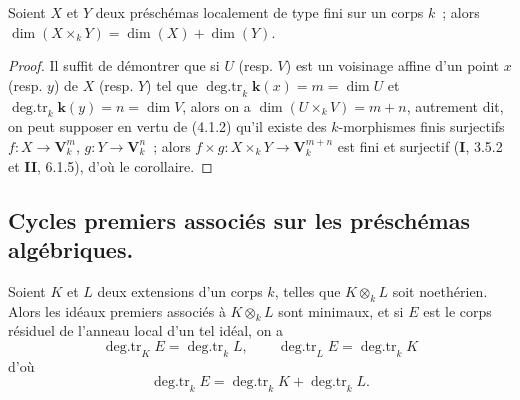 \begin{corollary}[4.1.5]
\label{IV.2.4.1.5-fr}
Soient $X$ et $Y$ deux préschémas localement de type fini sur un corps $k$~;
alors $\dim(X\times_k Y)=\dim(X)+\dim(Y)$.
\end{corollary}

\begin{proof}
Il suffit de démontrer que si $U$ (resp. $V$) est un voisinage affine d'un
point $x$ (resp. $y$) de $X$ (resp. $Y$) tel que
$\operatorname{deg.tr}_k \boldsymbol{k}(x)=m=\dim U$ et
$\operatorname{deg.tr}_k \boldsymbol{k}(y)=n=\dim V$, alors on a
$\dim(U\times_k V)=m+n$, autrement dit, on peut supposer en vertu de (4.1.2)
qu'il existe des $k$-morphismes finis surjectifs
$f:X\to\mathbf V_k^m$, $g:Y\to\mathbf V_k^n$~; alors
$f\times g:X\times_k Y\to\mathbf V_k^{m+n}$ est fini et surjectif
(\textbf{I}, 3.5.2 et \textbf{II}, 6.1.5), d'où le corollaire.
\end{proof}

\subsection{Cycles premiers associés sur les préschémas algébriques.}
\label{subsection:IV.2.4.2-fr}

\begin{proposition}[4.2.1]
Soient $K$ et $L$ deux extensions d'un corps $k$, telles que $K\otimes_k L$
soit noethérien. Alors les idéaux premiers associés à $K\otimes_k L$ sont
minimaux, et si $E$ est le corps résiduel de l'anneau local d'un tel idéal, on
a
\begin{equation}
\tag{4.2.1.1}
\label{IV.2.4.2.1.1-fr}
\operatorname{deg.tr}_K E=\operatorname{deg.tr}_k L,
\qquad
\operatorname{deg.tr}_L E=\operatorname{deg.tr}_k K
\end{equation}
d'où
\begin{equation}
\tag{4.2.1.2}
\label{IV.2.4.2.1.2-fr}
\operatorname{deg.tr}_k E
=\operatorname{deg.tr}_k K+\operatorname{deg.tr}_k L.
\end{equation}
\end{proposition}

